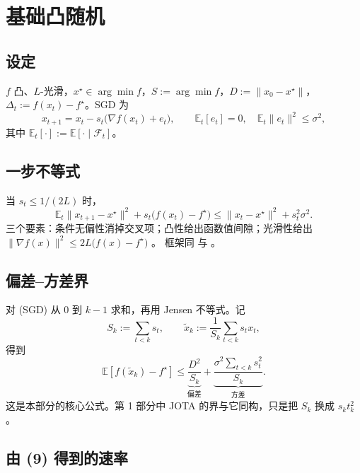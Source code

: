 \documentclass[11pt]{ctexart}
\newcommand{\E}{\mathbb{E}}
\newcommand{\F}{\mathcal{F}}
\begin{document}
\setcounter{section}{1}
\section{基础凸随机}

\subsection{设定}

$f$ 凸、$L$-光滑，$x^\star\in\arg\min f$，$S:=\arg\min f$，$D:=\|x_0-x^\star\|$，$\Delta_t:=f(x_t)-f^\star$。SGD \citep{robbins1951} 为
\[
x_{t+1}=x_t-s_t\bigl(\nabla f(x_t)+e_t\bigr),
\qquad
\E_t[e_t]=0,
\quad
\E_t\|e_t\|^2\le\sigma^2,
\]
其中 $\E_t[\cdot]:=\E[\cdot\mid\F_t]$。

\subsection{一步不等式}

当 $s_t\le 1/(2L)$ 时，
\begin{equation}
\boxed{\;
\E_t\|x_{t+1}-x^\star\|^2+s_t\bigl(f(x_t)-f^\star\bigr)
\le \|x_t-x^\star\|^2+s_t^2\sigma^2 .
\;}
\tag{SGD}
\end{equation}
三个要素：条件无偏性消掉交叉项；凸性给出函数值间隙；光滑性给出 $\|\nabla f(x)\|^2\le 2L\bigl(f(x)-f^\star\bigr)$ \citep[Theorem~2.1.5]{nesterov2004}。
框架同 \citet{nemirovski2009} 与 \citet{bottou2018}。

\subsection{偏差--方差界}

对 (SGD) 从 $0$ 到 $k-1$ 求和，再用 Jensen 不等式。记
\[
S_k:=\sum_{t<k}s_t,
\qquad
\widetilde x_k:=\frac1{S_k}\sum_{t<k}s_tx_t ,
\]
得到 \citep{nemirovski2009,bottou2018}
\begin{equation}
\boxed{\;
\E[f(\widetilde x_k)-f^\star]
\le
\underbrace{\frac{D^2}{S_k}}_{\text{偏差}}
+\underbrace{\frac{\sigma^2\sum_{t<k}s_t^2}{S_k}}_{\text{方差}} .
\;}
\tag{9}
\end{equation}
这是本部分的核心公式。第 1 部分中 JOTA 的界与它同构，只是把 $S_k$ 换成 $s_kt_k^2$。

\subsection{由 (9) 得到的速率}
\end{document}
